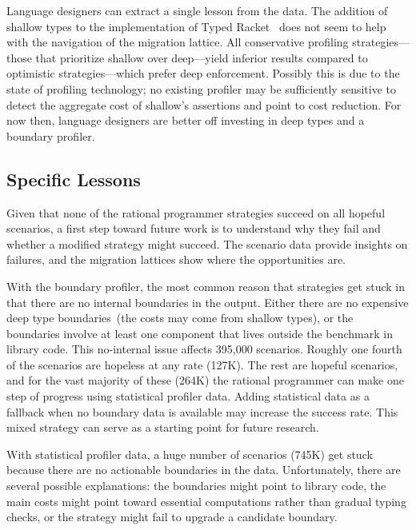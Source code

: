 Language designers can extract a single lesson from the data.  The addition of
shallow types to the implementation of Typed Racket~\cite{g-deep-shallow} does
not seem to help with the navigation of the migration lattice. All conservative
profiling strategies---those that prioritize shallow over deep---yield inferior
results compared to optimistic strategies---which prefer deep
enforcement. Possibly this is due to the state of profiling technology; no
existing profiler may be sufficiently sensitive to detect the aggregate cost of
shallow's assertions and point to cost reduction.  For now then, language
designers are better off investing in deep types and a boundary profiler.


\subsection{Specific Lessons}
\label{s:specific-lessons}

Given that none of the rational programmer strategies
succeed on all hopeful scenarios, a first step toward
future work is to understand why they fail and whether
a modified strategy might succeed.
The scenario data provide insights on failures,
and the migration lattices show where the opportunities are.

With the boundary profiler, the most common reason that strategies get stuck in
that there are no {internal} boundaries in the output.  Either there are no
expensive deep type boundaries~(the costs may come from shallow types),
or the boundaries involve at least one component that lives
outside the benchmark in library code.  This no-internal issue affects 395,000 scenarios.
Roughly one fourth of the scenarios are hopeless at any rate (127K).  The rest
are hopeful scenarios, and for the vast majority of these
(264K) the rational programmer can make one step of progress using statistical profiler data.
Adding statistical data as a
fallback when no boundary data is available may increase the
success rate.
This mixed strategy can serve as a starting point for future research.

With statistical profiler data, a huge number of scenarios (745K) get stuck
because there are no actionable boundaries in the data.
Unfortunately, there are several possible explanations:
the boundaries might point to library code, the main costs might point toward
essential computations rather than gradual typing checks, or the strategy
might fail to upgrade a candidate boundary.

